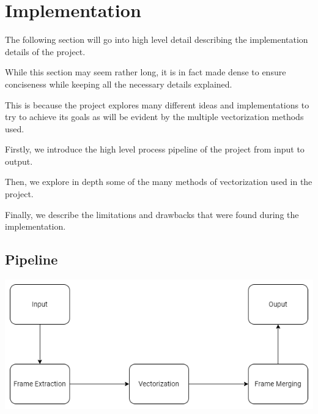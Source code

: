 \documentclass[12pt]{article}
\newcommand{\sentence}{} %
\begin{document}
    \pagebreak


    \section{Implementation}\label{sec:implementation}

    \tab
    The following section will go into high level detail describing the implementation details of the project.
    \sentence
    While this section may seem rather long, it is in fact made dense to ensure conciseness while keeping all the
    necessary details explained.
    \sentence
    This is because the project explores many different ideas and implementations to try to achieve its goals as will
    be evident by the multiple vectorization methods used.
    \sentence
    Firstly, we introduce the high level process pipeline of the project from input to output.
    \sentence
    Then, we explore in depth some of the many methods of vectorization used in the project.
    \sentence
    Finally, we describe the limitations and drawbacks that were found during the implementation.

    \subsection{Pipeline}\label{subsec:pipeline}

    \bigskip


    \includegraphics[width=\textwidth]{Pipeline.png}


    \bigskip
\end{document}
